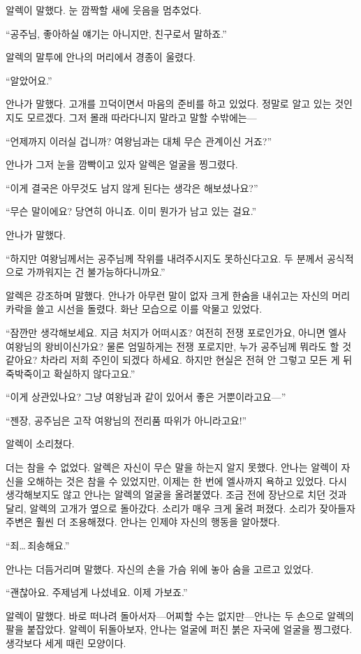 알렉이 말했다. 눈 깜짝할 새에 웃음을 멈추었다.

``공주님, 좋아하실 얘기는 아니지만, 친구로서 말하죠.''

알렉의 말투에 안나의 머리에서 경종이 울렸다.

``알았어요.''

안나가 말했다. 고개를 끄덕이면서 마음의 준비를 하고 있었다. 정말로 알고 있는 것인지도 모르겠다. 그저 몰래 따라다니지 말라고 말할 수밖에는—

``언제까지 이러실 겁니까? 여왕님과는 대체 무슨 관계이신 거죠?''

안나가 그저 눈을 깜빡이고 있자 알렉은 얼굴을 찡그렸다.

``이게 결국은 아무것도 남지 않게 된다는 생각은 해보셨나요?''

``무슨 말이에요? 당연히 아니죠. 이미 뭔가가 남고 있는 걸요.''

안나가 말했다.

``하지만 여왕님께서는 공주님께 작위를 내려주시지도 못하신다고요. 두 분께서 공식적으로 가까워지는 건 불가능하다니까요.''

알렉은 강조하며 말했다. 안나가 아무런 말이 없자 크게 한숨을 내쉬고는 자신의 머리카락을 쓸고 시선을 돌렸다. 화난 모습으로 이를 악물고 있었다.

``잠깐만 생각해보세요. 지금 처지가 어떠시죠? 여전히 전쟁 포로인가요, 아니면 엘사 여왕님의 왕비이신가요? 물론 엄밀하게는 전쟁 포로지만, 누가 공주님께 뭐라도 할 것 같아요? 차라리 저희 주인이 되겠다 하세요. 하지만 현실은 전혀 안 그렇고 모든 게 뒤죽박죽이고 확실하지 않다고요.''

``이게 상관있나요? 그냥 여왕님과 같이 있어서 좋은 거뿐이라고요—''

``젠장, 공주님은 고작 여왕님의 전리품 따위가 아니라고요!''

알렉이 소리쳤다.

더는 참을 수 없었다. 알렉은 자신이 무슨 말을 하는지 알지 못했다. 안나는 알렉이 자신을 오해하는 것은 참을 수 있었지만, 이제는 한 번에 엘사까지 욕하고 있었다. 다시 생각해보지도 않고 안나는 알렉의 얼굴을 올려붙였다. 조금 전에 장난으로 치던 것과 달리, 알렉의 고개가 옆으로 돌아갔다. 소리가 매우 크게 울려 퍼졌다. 소리가 잦아들자 주변은 훨씬 더 조용해졌다. 안나는 인제야 자신의 행동을 알아챘다.

``죄\ldots\,죄송해요.''

안나는 더듬거리며 말했다. 자신의 손을 가슴 위에 놓아 숨을 고르고 있었다.

``괜찮아요. 주제넘게 나섰네요. 이제 가보죠.''

알렉이 말했다. 바로 떠나려 돌아서자—어찌할 수는 없지만—안나는 두 손으로 알렉의 팔을 붙잡았다. 알렉이 뒤돌아보자, 안나는 얼굴에 퍼진 붉은 자국에 얼굴을 찡그렸다. 생각보다 세게 때린 모양이다.

